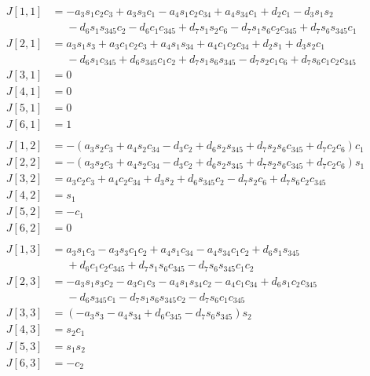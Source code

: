 \documentclass[onecolumn,10pt]{jhwhw}
\begin{document}
\begin{align*}
J[1,1] &= - a_{3} s_{1} c_{2} c_{3} + a_{3} s_{3} c_{1} - a_{4} s_{1} c_{2} c_{34} + a_{4} s_{34} c_{1} + d_{2} c_{1} - d_{3} s_{1} s_{2} \\
       &\phantom{= }- d_{6} s_{1} s_{345} c_{2} - d_{6} c_{1} c_{345} + d_{7} s_{1} s_{2} c_{6} - d_{7} s_{1} s_{6} c_{2} c_{345} + d_{7} s_{6} s_{345} c_{1} \\
J[2,1] &= a_{3} s_{1} s_{3} + a_{3} c_{1} c_{2} c_{3} + a_{4} s_{1} s_{34} + a_{4} c_{1} c_{2} c_{34} + d_{2} s_{1} + d_{3} s_{2} c_{1} \\
       &\phantom{= }- d_{6} s_{1} c_{345} + d_{6} s_{345} c_{1} c_{2} + d_{7} s_{1} s_{6} s_{345} - d_{7} s_{2} c_{1} c_{6} + d_{7} s_{6} c_{1} c_{2} c_{345} \\
J[3,1] &= 0 \\
J[4,1] &= 0 \\
J[5,1] &= 0 \\
J[6,1] &= 1 \\
\\
J[1,2] &= - \left(a_{3} s_{2} c_{3} + a_{4} s_{2} c_{34} - d_{3} c_{2} + d_{6} s_{2} s_{345} + d_{7} s_{2} s_{6} c_{345} + d_{7} c_{2} c_{6}\right) c_{1} \\
J[2,2] &= - \left(a_{3} s_{2} c_{3} + a_{4} s_{2} c_{34} - d_{3} c_{2} + d_{6} s_{2} s_{345} + d_{7} s_{2} s_{6} c_{345} + d_{7} c_{2} c_{6}\right) s_{1} \\
J[3,2] &= a_{3} c_{2} c_{3} + a_{4} c_{2} c_{34} + d_{3} s_{2} + d_{6} s_{345} c_{2} - d_{7} s_{2} c_{6} + d_{7} s_{6} c_{2} c_{345} \\
J[4,2] &= s_{1} \\
J[5,2] &= - c_{1} \\
J[6,2] &= 0 \\
\\
J[1,3] &= a_{3} s_{1} c_{3} - a_{3} s_{3} c_{1} c_{2} + a_{4} s_{1} c_{34} - a_{4} s_{34} c_{1} c_{2} + d_{6} s_{1} s_{345} \\
       &\phantom{= }+ d_{6} c_{1} c_{2} c_{345} + d_{7} s_{1} s_{6} c_{345} - d_{7} s_{6} s_{345} c_{1} c_{2} \\
J[2,3] &= - a_{3} s_{1} s_{3} c_{2} - a_{3} c_{1} c_{3} - a_{4} s_{1} s_{34} c_{2} - a_{4} c_{1} c_{34} + d_{6} s_{1} c_{2} c_{345} \\
       &\phantom{= }- d_{6} s_{345} c_{1} - d_{7} s_{1} s_{6} s_{345} c_{2} - d_{7} s_{6} c_{1} c_{345} \\
J[3,3] &= \left(- a_{3} s_{3} - a_{4} s_{34} + d_{6} c_{345} - d_{7} s_{6} s_{345}\right) s_{2} \\
J[4,3] &= s_{2} c_{1} \\
J[5,3] &= s_{1} s_{2} \\
J[6,3] &= - c_{2} \\
\end{align*}
\end{document}
